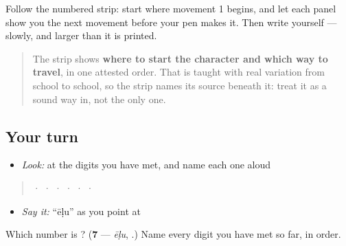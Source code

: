 Follow the numbered strip: start where movement 1 begins, and let each panel show you the next movement before your pen makes it. Then write  yourself — slowly, and larger than it is printed.

\begin{quote}
The strip shows \textbf{where to start the character and which way to travel}, in one attested order. That is taught with real variation from school to school, so the strip names its source beneath it: treat it as a sound way in, not the only one.
\end{quote}

\subsection*{Your turn}
\begin{itemize}
\raggedright
  \item \emph{Look:} at the digits you have met, and name each one aloud
\end{itemize}

\begin{quote}
  ·    ·    ·    ·    ·    ·  
\end{quote}

\begin{itemize}
\raggedright
  \item \emph{Say it:} \textquotedblleft{}ēḷu\textquotedblright{} as you point at 
\end{itemize}

\begin{tcolorbox}[breakable,colback=teal!4,colframe=teal!35!black,title={Before you move on}]
Which number is \textbf{}? (\textbf{7} — \emph{ēḷu}, .) Name every digit you have met so far, in order.
\end{tcolorbox}
